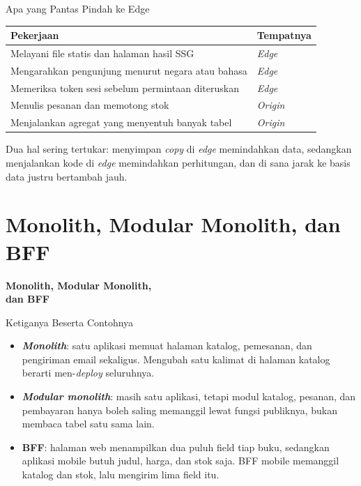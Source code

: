 \documentclass[aspectratio=169, table, 12pt]{beamer}
\begin{document}
\begin{frame}{{\Large Apa yang Pantas Pindah ke Edge}}
  \vspace{6pt}
  \centering
  {\footnotesize
  \begin{tabularx}{\textwidth}{Yl}
    \hline
    \textbf{Pekerjaan} & \textbf{Tempatnya} \\
    \hline
    Melayani file statis dan halaman hasil SSG & \textit{Edge} \\
    \hline
    Mengarahkan pengunjung menurut negara atau bahasa & \textit{Edge} \\
    \hline
    Memeriksa token sesi sebelum permintaan diteruskan & \textit{Edge} \\
    \hline
    Menulis pesanan dan memotong stok & \textit{Origin} \\
    \hline
    Menjalankan agregat yang menyentuh banyak tabel & \textit{Origin} \\
    \hline
  \end{tabularx}}

  \vspace{6pt}
  {\footnotesize Dua hal sering tertukar: menyimpan \textit{copy} di
  \textit{edge} memindahkan data, sedangkan menjalankan kode di
  \textit{edge} memindahkan perhitungan, dan di sana jarak ke basis data
  justru bertambah jauh.}
\end{frame}

\section{Monolith, Modular Monolith, dan BFF}

\begin{frame}{\hfill}
  \centering
  \Huge{\textbf{Monolith, Modular Monolith,\\dan BFF}}
\end{frame}

\begin{frame}{{\Large Ketiganya Beserta Contohnya}}
  \vspace{10pt}
  \begin{itemize}
    \item \textbf{\textit{Monolith}}: satu aplikasi memuat halaman
          katalog, pemesanan, dan pengiriman email sekaligus. Mengubah satu
          kalimat di halaman katalog berarti men-\textit{deploy} seluruhnya.
    \item \textbf{\textit{Modular monolith}}: masih satu aplikasi, tetapi
          modul katalog, pesanan, dan pembayaran hanya boleh saling memanggil
          lewat fungsi publiknya, bukan membaca tabel satu sama lain.
    \item \textbf{BFF}: halaman web menampilkan dua puluh field tiap buku,
          sedangkan aplikasi mobile butuh judul, harga, dan stok saja. BFF
          mobile memanggil katalog dan stok, lalu mengirim lima field itu.
  \end{itemize}
\end{frame}
\end{document}
